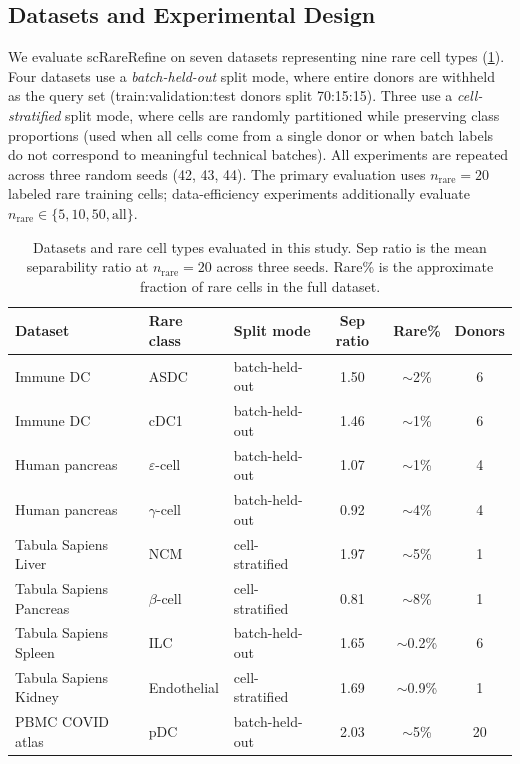 \subsection{Datasets and Experimental Design}
\label{sec:datasets}

We evaluate scRareRefine on seven datasets representing nine rare cell types (\cref{tab:datasets}). Four datasets use a \emph{batch-held-out} split mode, where entire donors are withheld as the query set (train:validation:test donors split 70:15:15). Three use a \emph{cell-stratified} split mode, where cells are randomly partitioned while preserving class proportions (used when all cells come from a single donor or when batch labels do not correspond to meaningful technical batches). All experiments are repeated across three random seeds (42, 43, 44). The primary evaluation uses $n_\text{rare} = 20$ labeled rare training cells; data-efficiency experiments additionally evaluate $n_\text{rare} \in \{5, 10, 50, \text{all}\}$.

\begin{table}[t]
\centering
\small
\caption{Datasets and rare cell types evaluated in this study. Sep ratio is the mean separability ratio at $n_\text{rare} = 20$ across three seeds. Rare\% is the approximate fraction of rare cells in the full dataset.}
\label{tab:datasets}
\begin{tabular}{lllccc}
\toprule
Dataset & Rare class & Split mode & Sep ratio & Rare\% & Donors \\
\midrule
Immune DC \citep{villani2017single} & ASDC & batch-held-out & 1.50 & $\sim$2\% & 6 \\
Immune DC \citep{villani2017single} & cDC1 & batch-held-out & 1.46 & $\sim$1\% & 6 \\
Human pancreas \citep{baron2016single} & $\varepsilon$-cell & batch-held-out & 1.07 & $\sim$1\% & 4 \\
Human pancreas \citep{baron2016single} & $\gamma$-cell & batch-held-out & 0.92 & $\sim$4\% & 4 \\
Tabula Sapiens Liver \citep{tabulasapiens2022} & NCM & cell-stratified & 1.97 & $\sim$5\% & 1 \\
Tabula Sapiens Pancreas \citep{tabulasapiens2022} & $\beta$-cell & cell-stratified & 0.81 & $\sim$8\% & 1 \\
Tabula Sapiens Spleen \citep{tabulasapiens2022} & ILC & batch-held-out & 1.65 & $\sim$0.2\% & 6 \\
Tabula Sapiens Kidney \citep{tabulasapiens2022} & Endothelial & cell-stratified & 1.69 & $\sim$0.9\% & 1 \\
PBMC COVID atlas \citep{stephenson2021single} & pDC & batch-held-out & 2.03 & $\sim$5\% & 20 \\
\bottomrule
\end{tabular}
\end{table}

